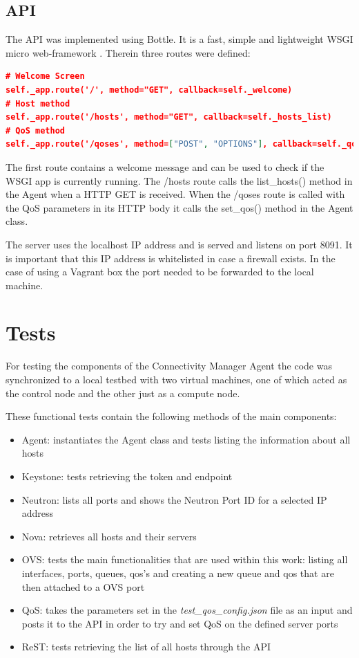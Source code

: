 \subsection{API}

The API was implemented using Bottle. It is a fast, simple and lightweight WSGI micro web-framework \cite{bottle-docs}. Therein three routes were defined:
\begin{lstlisting}[language=json]
# Welcome Screen
self._app.route('/', method="GET", callback=self._welcome)
# Host method
self._app.route('/hosts', method="GET", callback=self._hosts_list)
# QoS method
self._app.route('/qoses', method=["POST", "OPTIONS"], callback=self._qoses_set)
\end{lstlisting}

The first route contains a welcome message and can be used to check if the WSGI app is currently running.
The /hosts route calls the list\_hosts() method in the Agent when a HTTP GET is received.
When the /qoses route is called with the QoS parameters in its HTTP body it calls the set\_qos() method in the Agent class.

The server uses the localhost IP address and is served and listens on port 8091. It is important that this IP address is whitelisted in case a firewall exists. In the case of using a Vagrant box the port needed to be forwarded to the local machine.

\section{Tests}

For testing the components of the Connectivity Manager Agent the code was synchronized to a local testbed with two virtual machines, one of which acted as the control node and the other just as a compute node. 

These functional tests contain the following methods of the main components:
\begin{itemize}
\item Agent: instantiates the Agent class and tests listing the information about all hosts
\item Keystone: tests retrieving the token and endpoint
\item Neutron: lists all ports and shows the Neutron Port ID for a selected IP address
\item Nova: retrieves all hosts and their servers
\item OVS: tests the main functionalities that are used within this work: listing all interfaces, ports, queues, qos's and creating a new queue and qos that are then attached to a OVS port
\item QoS: takes the parameters set in the \textit{test\_qos\_config.json} file as an input and posts it to the API in order to try and set QoS on the defined server ports
\item ReST: tests retrieving the list of all hosts through the API
\end{itemize}


